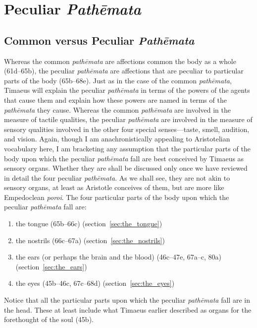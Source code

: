 
\chapter{Peculiar \emph{Pathēmata}} %
\label{cha:peculiar_pathemata}

\section{Common versus Peculiar \emph{Pathēmata}} %
\label{sec:common_versus_peculiar_pathemata}

Whereas the common \emph{pathēmata} are affections common the body as a whole (61d--65b), the peculiar \emph{pathēmata} are affections that are peculiar to particular parts of the body (65b--68e). Just as in the case of the common \emph{pathēmata}, Timaeus will explain the peculiar \emph{pathēmata} in terms of the powers of the agents that cause them and explain how these powers are named in terms of the \emph{pathēmata} they cause. Whereas the common \emph{pathēmata} are involved in the measure of tactile qualities, the peculiar \emph{pathēmata} are involved in the measure of sensory qualities involved in the other four special senses---taste, smell, audition, and vision. Again, though I am anachronistically appealing to Aristotelian vocabulary here, I am bracketing any assumption that the particular parts of the body upon which the peculiar \emph{pathēmata} fall are best conceived by Timaeus as sensory organs. Whether they are shall be discussed only once we have reviewed in detail the four peculiar \emph{pathēmata}. As we shall see, they are not akin to sensory organs, at least as Aristotle conceives of them, but are more like Empedoclean \emph{poroi}. The four particular parts of the body upon which the peculiar \emph{pathēmata} fall are:
\begin{enumerate}[(1)]
	\item the tongue (65b--66c) (section~\ref{sec:the_tongue})
	\item the nostrils (66c--67a) (section~\ref{sec:the_nostrils})
	\item the ears (or perhaps the brain and the blood) (46c--47e, 67a--c, 80a) (section~\ref{sec:the_ears})
	\item the eyes (45b--46c, 67c--68d) (section~\ref{sec:the_eyes})
\end{enumerate}
Notice that all the particular parts upon which the peculiar \emph{pathēmata} fall are in the head. These at least include what Timaeus earlier described as organs for the forethought of the soul (45b).

